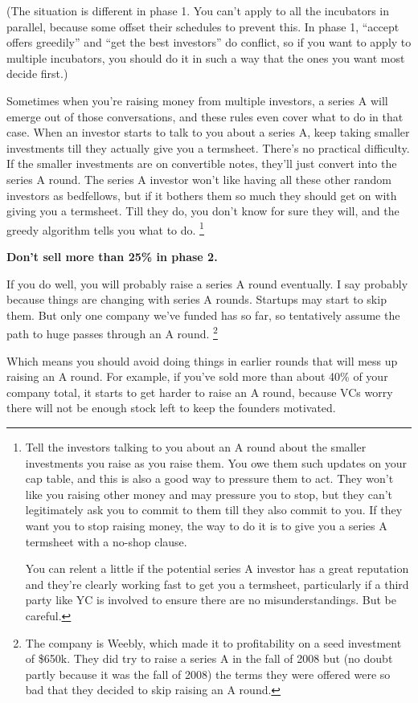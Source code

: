 \documentclass[12pt]{book}
\begin{document}
(The situation is different in phase 1. You can't apply to all the
incubators in parallel, because some offset their schedules to prevent
this. In phase 1, ``accept offers greedily'' and ``get the best
investors'' do conflict, so if you want to apply to multiple incubators,
you should do it in such a way that the ones you want most decide
first.)

Sometimes when you're raising money from multiple investors, a series A
will emerge out of those conversations, and these rules even cover what
to do in that case. When an investor starts to talk to you about a
series A, keep taking smaller investments till they actually give you a
termsheet. There's no practical difficulty. If the smaller investments
are on convertible notes, they'll just convert into the series A round.
The series A investor won't like having all these other random investors
as bedfellows, but if it bothers them so much they should get on with
giving you a termsheet. Till they do, you don't know for sure they will,
and the greedy algorithm tells you what to do. \footnote{Tell the investors talking to you about an A round about the
smaller investments you raise as you raise them. You owe them such
updates on your cap table, and this is also a good way to pressure them
to act. They won't like you raising other money and may pressure you to
stop, but they can't legitimately ask you to commit to them till they
also commit to you. If they want you to stop raising money, the way to
do it is to give you a series A termsheet with a no-shop clause.

You can relent a little if the potential series A investor has a great
reputation and they're clearly working fast to get you a termsheet,
particularly if a third party like YC is involved to ensure there are no
misunderstandings. But be careful.}

\textbf{Don't sell more than 25\% in phase 2.}

If you do well, you will probably raise a series A round eventually. I
say probably because things are changing with series A rounds. Startups
may start to skip them. But only one company we've funded has so far, so
tentatively assume the path to huge passes through an A round.
\footnote{The company is Weebly, which made it to profitability on a seed
investment of \$650k. They did try to raise a series A in the fall of
2008 but (no doubt partly because it was the fall of 2008) the terms
they were offered were so bad that they decided to skip raising an A
round.}

Which means you should avoid doing things in earlier rounds that will
mess up raising an A round. For example, if you've sold more than about
40\% of your company total, it starts to get harder to raise an A round,
because VCs worry there will not be enough stock left to keep the
founders motivated.
\end{document}
